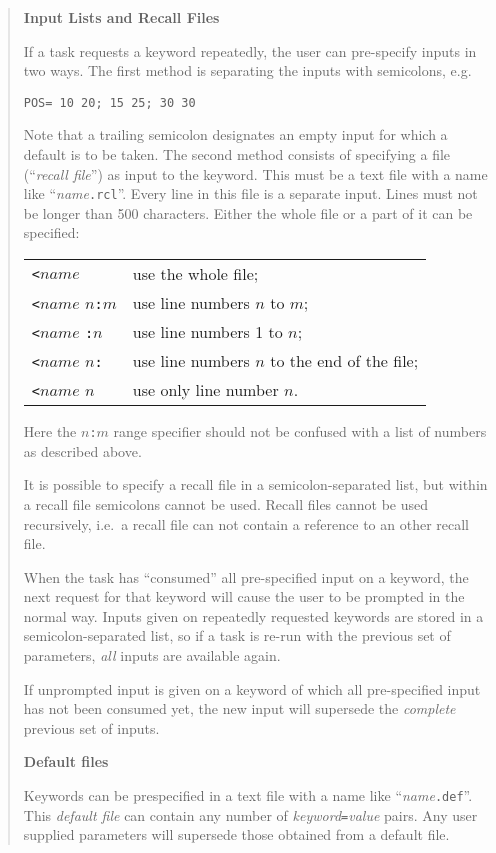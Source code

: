 \begin{quote}
\small
{\bf Input Lists and Recall Files}

If a task requests a keyword repeatedly, the user can pre-specify inputs in
two ways. The first method is separating the inputs with semicolons,
e.g.

{\tt POS= 10 20; 15 25; 30 30}

Note that a trailing semicolon
designates an empty input for which a default is to be taken.
The second method consists of specifying a file
(``{\em recall file\/}'') as input to the keyword.
This must be a text file  with a name like ``{\it name\/}{\tt .rcl}''.
Every line in this file is a separate input. Lines must not be longer than 500
characters.
Either the whole file or a part of it can be specified:

\begin{tabular}{ll}
{\tt <}$name$&use the whole file;\\
{\tt <}$name$ $n${\tt:}$m$&use line numbers $n$ to $m$;\\
{\tt <}$name$ {\tt:}$n$&use line numbers 1 to $n$;\\
{\tt <}$name$ $n${\tt:}&use line numbers $n$ to the end of the file;\\
{\tt <}$name$ $n$ &use only line number $n$.\\
\end{tabular}

Here the $n${\tt:}$m$ range specifier should not be confused with a list of
numbers as described above.

It is possible to specify a recall file in a semicolon-separated list, but
within a recall file semicolons cannot be used. Recall files cannot be used
recursively, i.e.\ a recall file can not contain a reference to an other
recall file.

When the task has ``consumed'' all pre-specified input on a keyword, the next
request for that keyword will cause the user to be prompted in the normal way.
Inputs given on repeatedly requested keywords are stored in a
semicolon-separated list, so if a task is re-run with the previous set of
parameters, {\em all\/} inputs are available again.

If unprompted input is given on a keyword of which all pre-specified input has
not been consumed yet, the new input will supersede the {\em complete\/}
previous set of inputs.

\newpage
{\bf Default files}

Keywords can be prespecified in a text file with a name like
``{\it name\/}{\tt .def}''. This {\em default file\/} can contain any
number of {\it keyword\/}{\tt =}{\it value}\/ pairs.
Any user supplied parameters will supersede those obtained from a default file.


\end{quote}
